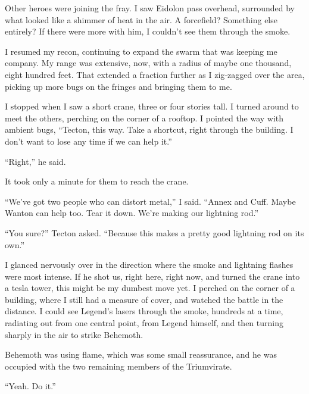 Other heroes were joining the fray.  I saw Eidolon pass overhead, surrounded by what looked like a shimmer of heat in the air.  A forcefield?  Something else entirely?  If there were more with him, I couldn't see them through the smoke.



I resumed my recon, continuing to expand the swarm that was keeping me company.  My range was extensive, now, with a radius of maybe one thousand, eight hundred feet.  That extended a fraction further as I zig-zagged over the area, picking up more bugs on the fringes and bringing them to me.



I stopped when I saw a short crane, three or four stories tall.  I turned around to meet the others, perching on the corner of a rooftop.  I pointed the way with ambient bugs, ``Tecton, this way.  Take a shortcut, right through the building.  I don't want to lose any time if we can help it.''



``Right,'' he said.



It took only a minute for them to reach the crane.



``We've got two people who can distort metal,'' I said.  ``Annex and Cuff.  Maybe Wanton can help too.  Tear it down.  We're making our lightning rod.''



``You sure?'' Tecton asked.  ``Because this makes a pretty good lightning rod on its own.''



I glanced nervously over in the direction where the smoke and lightning flashes were most intense.  If he shot us, right here, right now, and turned the crane into a tesla tower, this might be my dumbest move yet.  I perched on the corner of a building, where I still had a measure of cover, and watched the battle in the distance.  I could see Legend's lasers through the smoke, hundreds at a time, radiating out from one central point, from Legend himself, and then turning sharply in the air to strike Behemoth.



Behemoth was using flame, which was some small reassurance, and he was occupied with the two remaining members of the Triumvirate.



``Yeah.  Do it.''



